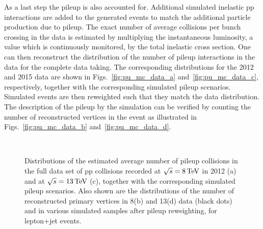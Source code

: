 As a last step the pileup is also accounted for.
Additional simulated inelastic pp interactions are added to the generated events to match the additional particle production due to pileup.
The exact number of average collisions per bunch crossing in the data is estimated by multiplying the instantaneous luminosity, a value which is continuously monitored, by the total inelastic cross section.
One can then reconstruct the distribution of the number of pileup interactions in the data for the complete data taking.
The corresponding distributions for the 2012 and 2015 data are shown in Figs.~\ref{fig:pu_mc_data_a} and~\ref{fig:pu_mc_data_c}, respectively, together with the corresponding simulated pileup scenarios.
Simulated events are then reweighted such that they match the data distribution. The description of the pileup by the simulation can be verified by counting the number of reconstructed vertices in the event as illustrated in Figs.~\ref{fig:pu_mc_data_b} and~\ref{fig:pu_mc_data_d}.\\

\begin{figure}[!htb]
\centering
{}
\\
\caption{Distributions of the estimated average number of pileup collisions in the full data set of pp collisions recorded at $\sqrt{s} = 8\,\text{Te\hspace{-.08em}V}$ in 2012 (a) and at $\sqrt{s} = 13\,\text{Te\hspace{-.08em}V}$ (c), together with the corresponding simulated pileup scenarios. Also shown are the distributions of the number of reconstructed primary vertices in 8\TeV (b) and 13\TeV (d) data (black dots) and in various simulated samples after pileup reweighting, for lepton+jet events.}
\label{fig:pu_mc_data}
\end{figure}

